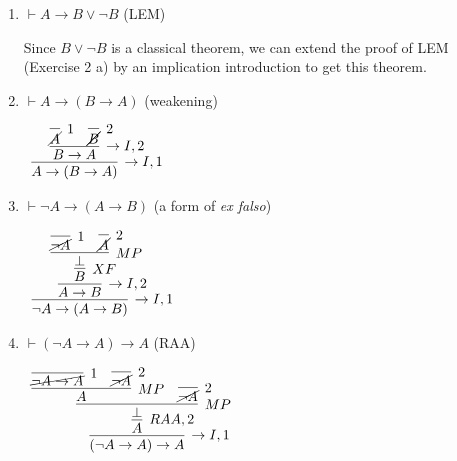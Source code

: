 \documentclass[11pt]{report}
\begin{document}
\begin{enumerate}
\begin{enumerate}
		\item \(\vdash A\to B\lor\neg B\) \hfill (LEM)
		
		\hspace{0.2cm}{\bf Solution}

		Since $B \lor \lnot B$ is a classical theorem, we can extend the proof of LEM (Exercise 2 a) by an implication introduction to get this theorem. 

		\item \(\vdash A\to( B\to A)\) \hfill (weakening)
		
		\hspace{0.2cm}{\bf Solution}
		\begin{mdframed}
			\begin{center}
				$\begin{array}{c}
					\infer[\to I,1]{A \to (B \to A)}
						{\infer[\to I,2]{B \to A}
							{\infer[1]{\cancel{A}}{}
							&
							\infer[2]{\cancel{B}}{}}}
				\end{array}$
			\end{center}
		\end{mdframed}

		\item \(\vdash  \neg A\to( A \to B)\) \hfill (a form of \emph{ex falso})
		
		\hspace{0.2cm}{\bf Solution}
		\begin{mdframed}
			\begin{center}
				$\begin{array}{c}
					\infer[\to I,1]{\lnot A \to (A \to B)}
						{\infer[\to I,2]{A \to B}
							{\infer[XF]{B}
								{\infer[MP]{\bot}
									{\infer[1]{\cancel{\lnot A}}{}
									&
									\infer[2]{\cancel{A}}{}}}}}
				\end{array}$
			\end{center}
		\end{mdframed}

		\item $\vdash (\neg A\to A)\to A$ \hfill (RAA)
		
		\hspace{0.2cm}{\bf Solution}

		\begin{mdframed}	
			\begin{center}
				$\begin{array}{c}
					\infer[\to I,1]{(\lnot A \to A) \to A}
						{\infer[RAA,2]{A}
							{\infer[MP]{\bot}
								{\infer[MP]{A}
									{\infer[1]{\cancel{\lnot A \to A}}{} & \infer[2]{\cancel{\lnot A}}{}} 
								&
								\infer[2]{\cancel{\lnot A}}{}}}}
				\end{array}$
			\end{center}
		\end{mdframed}


\end{enumerate}
\end{enumerate}
\end{document}

